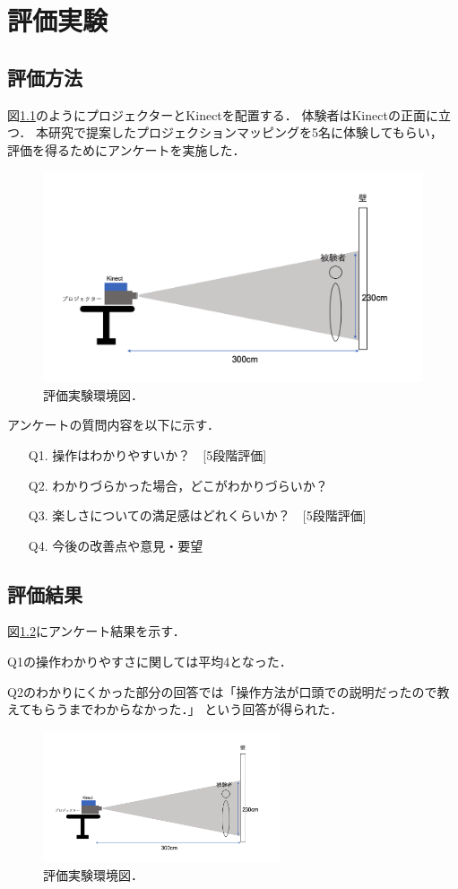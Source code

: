 \chapter{評価実験}
\thispagestyle{fancy}


\section{評価方法}
図\ref{kankyou}のようにプロジェクターとKinectを配置する．
体験者はKinectの正面に立つ．
本研究で提案したプロジェクションマッピングを5名に体験してもらい，
評価を得るためにアンケートを実施した．

\vspace{1cm}
\begin{figure}[h]
  \centering
  \includegraphics[width=14cm]{image/jikkenkankyou.png}
  \caption[評価実験環境図]{評価実験環境図．}
\label{kankyou}
\end{figure}


\clearpage

アンケートの質問内容を以下に示す．
\begin{itemize}
  \item[Q1.] 操作はわかりやすいか？　[5段階評価]
  \item[Q2.] わかりづらかった場合，どこがわかりづらいか？ 
  \item[Q3.] 楽しさについての満足感はどれくらいか？　[5段階評価]
  \item[Q4.] 今後の改善点や意見・要望   
\end{itemize}



\section{評価結果}
図\ref{hyouka}にアンケート結果を示す．

Q1の操作わかりやすさに関しては平均4となった．

Q2のわかりにくかった部分の回答では「操作方法が口頭での説明だったので教えてもらうまでわからなかった．」
という回答が得られた．


\vspace{1cm}
\begin{figure}[h]
  \centering
  \includegraphics[width=7cm]{image/jikkenkankyou.png}
  \caption[評価実験環境図]{評価実験環境図．}
\label{hyouka}
\end{figure}
